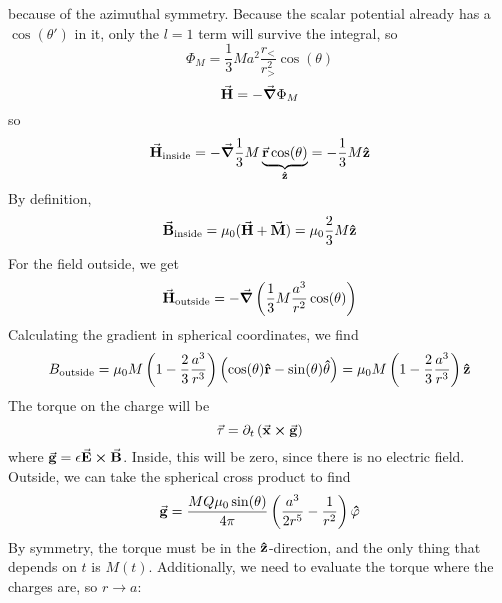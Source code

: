 \documentclass[a4paper,twoside]{article}
\begin{document}
\begin{itemize}
\begin{problem}
\begin{equation}
            \end{equation}
            because of the azimuthal symmetry. Because the scalar potential already has a $ \cos(\theta') $ in it, only the $ l = 1 $ term will survive the integral, so
            \begin{equation}
                \Phi_{M} = \frac{1}{3} M a^2 \frac{r_<}{r_>^2} \cos(\theta) 
            \end{equation}
            \begin{equation}
                \va{H} = - \grad{\Phi_{M}}
            \end{equation}
            so
            \begin{equation}
                \va{H}_{\text{inside}} = - \grad{\frac{1}{3} M \underbrace{ \va{r} \cos(\theta)}_{ \vu{z}}} = - \frac{1}{3} M \vu{z}
            \end{equation}
            By definition,
            \begin{equation}
                \va{B}_{\text{inside}} = \mu_0 ( \va{H} + \va{M} ) = \mu_0 \frac{2}{3} M \vu{z}
            \end{equation}
            For the field outside, we get
            \begin{equation}
                \va{H}_{\text{outside}} = - \grad{\left( \frac{1}{3} M \frac{a^3}{r^2} \cos(\theta) \right)}
            \end{equation}
            Calculating the gradient in spherical coordinates, we find
            \begin{equation}
                B_{\text{outside}} = \mu_0 M \left( 1 - \frac{2}{3} \frac{a^3}{r^3} \right) \left( \cos(\theta) \vu{r} - \sin(\theta) \vu{\theta} \right) = \mu_0 M \left( 1 - \frac{2}{3} \frac{a^3}{r^3} \right) \vu{z}
            \end{equation}
            The torque on the charge will be
            \begin{equation}
                \va{\tau} = \partial_t \left( \va{x} \cross \va{g} \right)
            \end{equation}
            where $ \va{g} = \epsilon \va{E} \cross \va{B} $. Inside, this will be zero, since there is no electric field. Outside, we can take the spherical cross product to find
            \begin{equation}
                \va{g} = \frac{MQ \mu_0 \sin(\theta)}{4 \pi} \left( \frac{a^3}{2 r^5} - \frac{1}{r^2} \right) \vu{\varphi}
            \end{equation}
            By symmetry, the torque must be in the $ \vu{z} $-direction, and the only thing that depends on $ t $ is $ M(t) $. Additionally, we need to evaluate the torque where the charges are, so $ r \to a $:

\end{problem}
\end{itemize}
\end{document}
